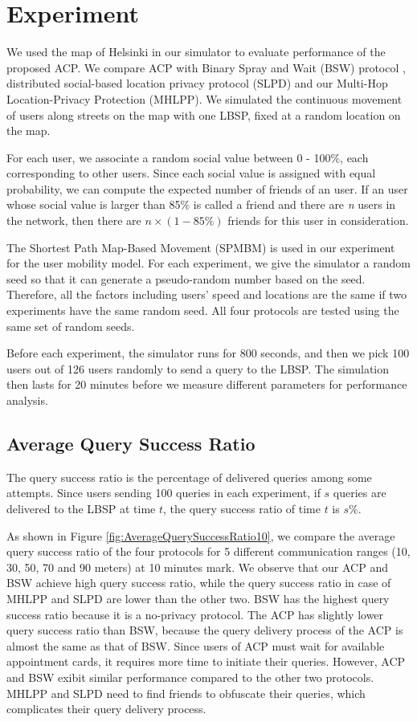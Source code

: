 
\section{ Experiment}

\noindent We used the map of Helsinki in our simulator to evaluate performance of the proposed ACP. We compare ACP with Binary Spray and Wait (BSW) protocol \cite{C31}, distributed social-based location privacy protocol (SLPD) \cite{C16} and our Multi-Hop Location-Privacy Protection (MHLPP). We simulated the continuous movement of users along streets on the map with one LBSP, fixed at a random location on the map.

For each user, we associate a random social value between 0 - 100\%, each corresponding to other users. Since each social value is assigned with equal probability, we can compute the expected number of friends of an user. If an user whose social value is larger than 85\% is called a friend and there are \textit{n} users in the network, then there are $n\times \left(1-85\%\right)$ friends for this user in consideration.

The Shortest Path Map-Based Movement (SPMBM) \cite{C35} is used in our experiment for the user mobility model. For each experiment, we give the simulator a random seed so that it can generate a pseudo-random number based on the seed. Therefore, all the factors including users' speed and locations are the same if two experiments have the same random seed. All four protocols are tested using the same set of random seeds.

Before each experiment, the simulator runs for 800 seconds, and then we pick 100 users out of 126 users randomly to send a query to the LBSP. The simulation then lasts for 20 minutes before we measure different parameters for performance analysis. 


\subsection{  Average Query Success Ratio}

\noindent The query success ratio is the percentage of delivered queries among some attempts. Since users sending 100 queries in each experiment, if $s$ queries are delivered to the LBSP at time $t$, the query success ratio of time $t$ is $s\%$.

As shown in Figure \ref{fig:AverageQuerySuccessRatio10}, we compare the average query success ratio of the four protocols for 5 different communication ranges (10, 30, 50, 70 and 90 meters) at 10 minutes mark. We observe that our ACP and BSW achieve high query success ratio, while the query success ratio in case of MHLPP and SLPD are lower than the other two. BSW has the highest query success ratio because it is a no-privacy protocol. The ACP has slightly lower query success ratio than BSW, because the query delivery process of the ACP is almost the same as that of BSW. Since users of ACP must wait for available appointment cards, it requires more time to initiate their queries. However, ACP and BSW exibit similar performance compared to the other two protocols. MHLPP and SLPD need to find friends to obfuscate their queries, which complicates their query delivery process.

